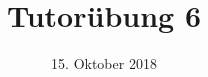 %
% 
% 
%







\newcommand{\Datum}{\today}

\renewcommand{\PraesentationFusszeileZusatz}{| Tutorium Grundlagen: Datenbanken WS 18/19}

\title{Tutorübung 6}
\author{\PersonVorname{} \PersonNachname}
\institute[]{\UniversitaetName \\ \FakultaetName}
\date[\Datum]{15. Oktober 2018}



\setlength{\baselineskip}{\PraesentationAbstandAbsatz}
\setlength{\parskip}{\baselineskip}

\PraesentationMasterStandard

\PraesentationTitelseite %

